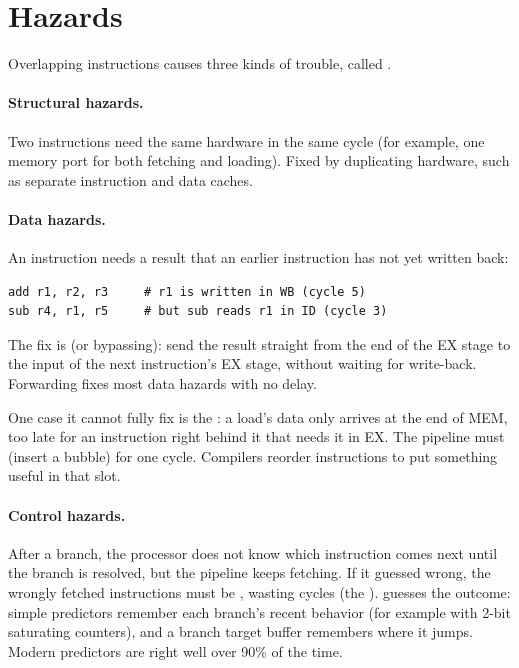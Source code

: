 \section{Hazards}

Overlapping instructions causes three kinds of trouble, called .

\paragraph{Structural hazards.} Two instructions need the same hardware in the same cycle (for example, one memory port for both fetching and loading). Fixed by duplicating hardware, such as separate instruction and data caches.

\paragraph{Data hazards.} An instruction needs a result that an earlier instruction has not yet written back:
\begin{lstlisting}
add r1, r2, r3     # r1 is written in WB (cycle 5)
sub r4, r1, r5     # but sub reads r1 in ID (cycle 3)
\end{lstlisting}
The fix is  (or bypassing): send the result straight from the end of the EX stage to the input of the next instruction's EX stage, without waiting for write-back. Forwarding fixes most data hazards with no delay.

One case it cannot fully fix is the : a load's data only arrives at the end of MEM, too late for an instruction right behind it that needs it in EX. The pipeline must  (insert a bubble) for one cycle. Compilers reorder instructions to put something useful in that slot.

\paragraph{Control hazards.} After a branch, the processor does not know which instruction comes next until the branch is resolved, but the pipeline keeps fetching. If it guessed wrong, the wrongly fetched instructions must be , wasting cycles (the ).  guesses the outcome: simple predictors remember each branch's recent behavior (for example with 2-bit saturating counters), and a branch target buffer remembers where it jumps. Modern predictors are right well over 90\% of the time.

